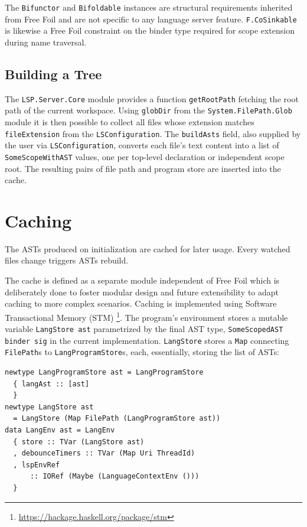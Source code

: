 The \texttt{Bifunctor} and \texttt{Bifoldable} instances are structural requirements inherited from Free Foil and are not specific to any language server feature.
\texttt{F.CoSinkable} is likewise a Free Foil constraint on the binder type required for scope extension during name traversal.

\subsection{Building a Tree}

The \texttt{LSP.Server.Core} module provides a function \texttt{getRootPath} fetching the root path of the current workspace.
Using \texttt{globDir} from the \texttt{System.FilePath.Glob} module it is then possible to collect all files whose extension matches \texttt{fileExtension} from the \texttt{LSConfiguration}.
The \texttt{buildAsts} field, also supplied by the user via \texttt{LSConfiguration}, converts each file's text content into a list of \texttt{SomeScopeWithAST} values, one per top-level declaration or independent scope root.
The resulting pairs of file path and program store are inserted into the cache.

\section{Caching}

The ASTs produced on initialization are cached for later usage. 
Every watched files change triggers ASTs rebuild.

The cache is defined as a separate module independent of Free Foil which is deliberately done to foster modular design and future extensibility to adapt caching to more complex scenarios.
Caching is implemented using Software Transactional Memory (STM) \footnote{\url{https://hackage.haskell.org/package/stm}}.
The program's environment stores a mutable variable \texttt{LangStore ast} parametrized by the final AST type, \texttt{SomeScopedAST binder sig} in the current implementation.
\texttt{LangStore} stores a \texttt{Map} connecting \texttt{FilePath}s to \texttt{LangProgramStore}s, each, essentially, storing the list of ASTs:

\begin{verbatim}
newtype LangProgramStore ast = LangProgramStore
  { langAst :: [ast]
  }
newtype LangStore ast
  = LangStore (Map FilePath (LangProgramStore ast))
data LangEnv ast = LangEnv
  { store :: TVar (LangStore ast)
  , debounceTimers :: TVar (Map Uri ThreadId)
  , lspEnvRef
      :: IORef (Maybe (LanguageContextEnv ()))
  }
\end{verbatim}

